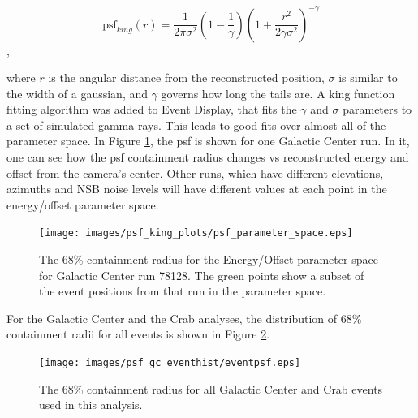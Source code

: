     \begin{equation} \label{eqn:king}
    \text{psf}_{king}(r) = \frac{1}{2 \pi \sigma^{2} } \left( 1 - \frac{1}{\gamma} \right) \left( 1 + \frac{ r^{2} }{ 2 \gamma \sigma^{2} } \right)^{-\gamma}
    \end{equation},

    where $r$ is the angular distance from the reconstructed position, $\sigma$ is similar to the width of a gaussian, and $\gamma$ governs how long the tails are.
    A king function fitting algorithm was added to Event Display, that fits the $\gamma$ and $\sigma$ parameters to a set of simulated gamma rays.
    This leads to good fits over almost all of the parameter space.
    In Figure \ref{fig:psf_paramspace}, the psf is shown for one Galactic Center run.
    In it, one can see how the psf containment radius changes vs reconstructed energy and offset from the camera's center.
    Other runs, which have different elevations, azimuths and NSB noise levels will have different values at each point in the energy/offset parameter space.

    \begin{figure}[ht]
      \centering
      \texttt{[image: images/psf\_king\_plots/psf\_parameter\_space.eps]}
      \caption[PSF Parameter Space]{
        The 68\% containment radius for the Energy/Offset parameter space for Galactic Center run 78128. 
        The green points show a subset of the event positions from that run in the parameter space.
      }
      \label{fig:psf_paramspace}
    \end{figure}

    For the Galactic Center and the Crab analyses, the distribution of 68\% containment radii for all events is shown in Figure \ref{fig:gc_psf_hist}.

    \begin{figure}[ht]
      \centering
      \texttt{[image: images/psf\_gc\_eventhist/eventpsf.eps]}
      \caption[Crab and Galactic Center Event PSFs]{
        The 68\% containment radius for all Galactic Center and Crab events used in this analysis.
      }
      \label{fig:gc_psf_hist}
    \end{figure}

